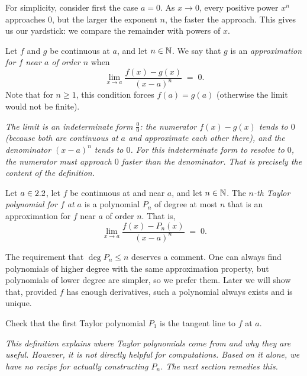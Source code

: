 For simplicity, consider first the case $a=0$.  As $x\to 0$, every positive power $x^{n}$ approaches $0$, but the larger the exponent $n$, the faster the approach.  This gives us our yardstick: we compare the remainder with powers of $x$.

\begin{definition}
\label{def:14-3}
Let $f$ and $g$ be continuous at $a$, and let $n\in\mathbb{N}$.  We say that $g$ is an \emph{approximation for $f$ near $a$ of order $n$} when
\[
  \lim_{x\to a}\frac{f(x)-g(x)}{(x-a)^{n}} \;=\; 0.
\]
Note that for $n\ge 1$, this condition forces $f(a)=g(a)$ (otherwise the limit would not be finite).
\end{definition}

\textit{The limit is an indeterminate form $\frac{0}{0}$: the numerator $f(x)-g(x)$ tends to $0$ (because both are continuous at $a$ and approximate each other there), and the denominator $(x-a)^{n}$ tends to $0$.  For this indeterminate form to resolve to $0$, the numerator must approach $0$ faster than the denominator.  That is precisely the content of the definition.}

\begin{definition}
\label{def:14-4}
Let $a\in2.2$, let $f$ be continuous at and near $a$, and let $n\in\mathbb{N}$.  The \emph{$n$-th Taylor polynomial for $f$ at $a$} is a polynomial $P_{n}$ of degree at most $n$ that is an approximation for $f$ near $a$ of order $n$.  That is,
\[
  \lim_{x\to a}\frac{f(x)-P_{n}(x)}{(x-a)^{n}} \;=\; 0.
\]
\end{definition}

\begin{remark}
The requirement that $\deg P_{n}\le n$ deserves a comment.  One can always find polynomials of higher degree with the same approximation property, but polynomials of lower degree are simpler, so we prefer them.  Later we will show that, provided $f$ has enough derivatives, such a polynomial always exists and is unique.
\end{remark}

\begin{remark}
Check that the first Taylor polynomial $P_{1}$ is the tangent line to $f$ at $a$.
\end{remark}

\textit{This definition explains where Taylor polynomials come from and why they are useful.  However, it is not directly helpful for computations.  Based on it alone, we have no recipe for actually \emph{constructing} $P_{n}$.  The next section remedies this.}


